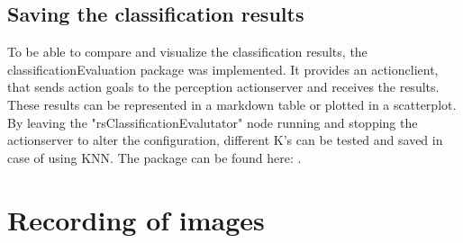 \documentclass[main.tex]{subfiles}
\begin{document}
			\subsection{Saving the classification results}
			To be able to compare and visualize the classification results, the classificationEvaluation package was implemented. It provides an actionclient, that 			sends action goals to the perception actionserver and receives the results. These results can be represented in a markdown table or plotted in a 						scatterplot. By leaving the "rsClassificationEvalutator" node running and stopping the actionserver to alter the configuration, different K's can be 					tested and saved in case of using KNN. The package can be found here: . 
		
		
		\section{Recording of images}  
\end{document}
